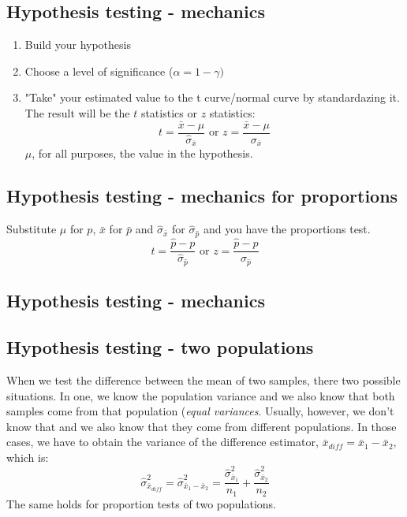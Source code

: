 \documentclass[11pt]{article}
\begin{document}
	\subsection*{Hypothesis testing - mechanics}
	\begin{enumerate}
		\item Build your hypothesis
		\item Choose a level of significance ($\alpha = 1 - \gamma)$
		\item "Take" your estimated value to the t curve/normal curve by standardazing it. The result will be the $t$ statistics or $z$ statistics:
		\[t = \frac{\bar{x} - \mu}{\hat{\sigma}_{\bar{x}}} \text{ or } z = \frac{\bar{x} - \mu}{\sigma_{\bar{x}}}\]
		$\mu$, for all purposes, the value in the hypothesis. 
	\end{enumerate}

	\subsection*{Hypothesis testing - mechanics for proportions}
	Substitute $\mu$ for $p$, $\bar{x}$ for $\bar{p}$ and $\hat{\sigma}_{\bar{x}}$ for $\hat{\sigma}_{\hat{p}}$ and you have the proportions test.
		\[t = \frac{\hat{p} - p}{\hat{\sigma}_{\hat{p}}} \text{ or } z = \frac{\hat{p} - p}{\sigma_{\hat{p}}}\]



	\subsection*{Hypothesis testing - mechanics}
	\subsection*{Hypothesis testing - two populations}
	When we test the difference between the mean of two samples, there two possible situations. In one, we know the population variance and we also know that both samples come from that population (\emph{equal variances}. Usually, however, we don't know that and we also know that they come from different populations. In those cases, we have to obtain the variance of the difference estimator, $\bar{x}_{diff} = \bar{x}_1 - \bar{x}_2$, which is:
	\[\hat{\sigma}^2_{\bar{x}_{diff}} = \hat{\sigma}^2_{\bar{x}_1 - \bar{x}_2} = \frac{\hat{\sigma}^2_{\bar{x}_1}}{n_1}+ \frac{\hat{\sigma}^2_{\bar{x}_2}}{n_2}\] 
	The same holds for proportion tests of two populations.
\end{document}
